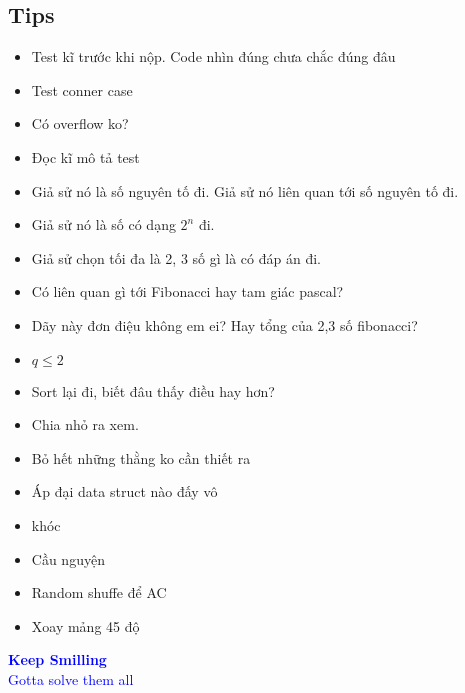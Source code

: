 \documentclass[A4 paper, 12pt, oneside]{article}
\begin{document}
\begin{multicols}{2}
	\section{Tips}
	\begin{itemize}[topsep=0pt, partopsep=0pt, itemsep=0pt]
	\item Test kĩ trước khi nộp. Code nhìn đúng chưa chắc đúng đâu
	\item Test conner case
	\item Có overflow ko?
	\item Đọc kĩ mô tả test
	\item Giả sử nó là số nguyên tố đi. Giả sử nó liên quan tới số nguyên tố đi.\\
	\item Giả sử nó là số có dạng \(2^n\) đi.\\
	\item Giả sử chọn tối đa là 2, 3 số gì là có đáp án đi.\\
	\item Có liên quan gì tới Fibonacci hay tam giác pascal?\\
	\item Dãy này đơn điệu không em ei? Hay tổng của 2,3 số fibonacci?\\
	\item \(q \leq 2\)\\
	\item Sort lại đi, biết đâu thấy điều hay hơn?\\
	\item Chia nhỏ ra xem.\\
	\item Bỏ hết những thằng ko cần thiết ra\\
	\item Áp đại data struct nào đấy vô\\
	\item khóc\\
	\item Cầu nguyện\\
	\item Random shuffe để AC\\
	\item Xoay mảng 45 độ\\
	\end{itemize}

	\end{multicols}

	\centering
	\Huge
	\textcolor{blue}{\textbf{Keep Smilling}} \\
	\textcolor{blue}{Gotta solve them all}
\end{document}
